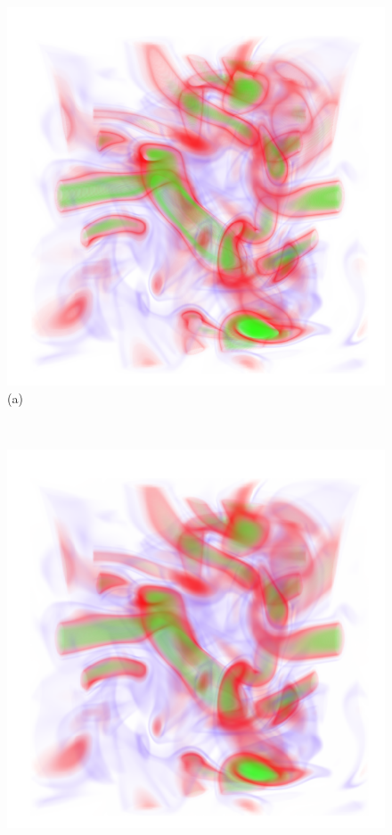 \documentclass[twoside,twocolumn,10pt]{article}
\begin{document}
\begin{figure}
	\centering
	\begin{minipage}{.33\textwidth}
		\centering
		\includegraphics[width=1\linewidth]{crop/vortex_merged_green_red_purple}
		(a)
	\end{minipage}~
	\begin{minipage}{.33\textwidth}
		\centering
		\includegraphics[width=1\linewidth]{crop/vortex_merged_segment_blend_green_red_purple}

\end{minipage}
\end{figure}
\end{document}
